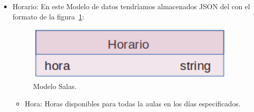 \documentclass[a4paper, 12pt]{book}
\begin{document}
\begin{itemize}
	\item Horario: En este Modelo de datos tendríamos almacenados JSON del con el formato de la figura~\ref{fig:mongoDBHorario}:
	\begin{figure}[h!]
  	\centering
  	\includegraphics[width=10cm, keepaspectratio]{img/mongoDBHorario.png}
  	\caption{Modelo Salas.}\label{fig:mongoDBHorario}
	\end{figure}
	\begin{itemize}
		\item Hora: Horas disponibles para todas la aulas en los días especificados.
	\end{itemize}
\end{itemize}
\end{document}
